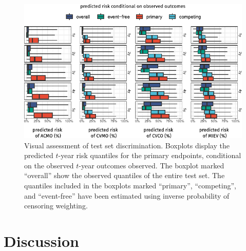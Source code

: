 \begin{figure}
    \includegraphics{graphics/pmhnet-v2-visual-discrimination.pdf}
    \caption[Test-set discrimination of ]{%
        Visual assessment of test set discrimination.  
        Boxplots display 
        the predicted \(t\)-year risk quantiles for the primary endpoints, 
        conditional on the observed \(t\)-year outcomes observed.  
        The boxplot marked \enquote{overall} show the observed 
        quantiles of the entire test set. 
        The quantiles included in the boxplots marked
        \enquote{primary}, \enquote{competing}, and \enquote{event-free}
        have been estimated using inverse probability of censoring weighting.
     }
    \label{fig:pmhnet-v2-discrimination}
\end{figure}


\section{Discussion}


